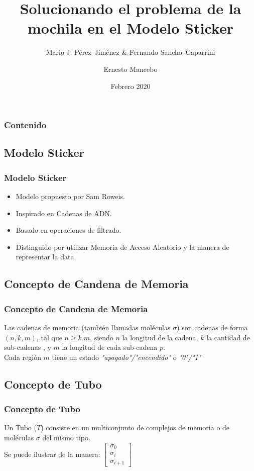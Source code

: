 \documentclass[12pt]{beamer}
\title{Solucionando el problema de la mochila en el Modelo Sticker}
\subtitle{Mario J. Pérez–Jiménez \& Fernando Sancho–Caparrini}
\author{Ernesto Mancebo}
\institute{Universidad de Sevilla}
\date{Febrero 2020}
\begin{document}
 \begin{frame}
    \titlepage
 \end{frame}
 \begin{frame}
     \frametitle{Contenido}
     \tableofcontents
 \end{frame}
 \begin{frame}
     \section{Modelo Sticker}
     \frametitle{Modelo Sticker}
     \begin{itemize}
         \item Modelo propuesto por Sam Roweis.
         \item Inspirado en Cadenas de ADN.
         \item Basado en operaciones de filtrado.
         \item Distinguido por utilizar Memoria de Acceso Aleatorio y la manera de representar la data.
     \end{itemize}
 \end{frame}
 \begin{frame}
     \subsection{Concepto de Candena de Memoria}
     \frametitle{Concepto de Candena de Memoria}
     Las cadenas de memoria (también llamadas moléculas $\sigma$) son cadenas de forma $(n, k, m)$, tal que $n\geq k.m$, siendo $n$ la longitud de la cadena, $k$ la cantidad de sub-cadenas , y $m$ la longitud de cada sub-cadena $p$. \\ 
     Cada región $m$ tiene un estado \emph{"apagado"/"encendido"} o \emph{"0"/"1"}
 \end{frame}
 \begin{frame}
     \subsection{Concepto de Tubo}
     \frametitle{Concepto de Tubo}
     Un Tubo ($T$) consiste en un multiconjunto de complejos de memoria o de moléculas $\sigma$ del mismo tipo. \\ Se puede ilustrar de la manera:
    $
    \left[
        \begin{array}{l}
            \sigma_0 \\
            \sigma_i \\
            \sigma_{i + 1} 
        \end{array}
    \right]
    $
 \end{frame}
\end{document}
